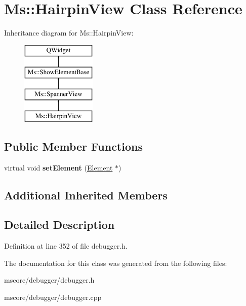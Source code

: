\hypertarget{class_ms_1_1_hairpin_view}{}\section{Ms\+:\+:Hairpin\+View Class Reference}
\label{class_ms_1_1_hairpin_view}
Inheritance diagram for Ms\+:\+:Hairpin\+View\+:\begin{figure}[H]
\begin{center}
\leavevmode
\includegraphics[height=4.000000cm]{class_ms_1_1_hairpin_view}
\end{center}
\end{figure}
\subsection*{Public Member Functions}
\begin{DoxyCompactItemize}
\item 
\mbox{\label{class_ms_1_1_hairpin_view_a366fc3417044393769df2a66c377f084}} 
virtual void {\bfseries set\+Element} (\hyperlink{class_ms_1_1_element}{Element} $\ast$)
\end{DoxyCompactItemize}
\subsection*{Additional Inherited Members}


\subsection{Detailed Description}


Definition at line 352 of file debugger.\+h.



The documentation for this class was generated from the following files\+:\begin{DoxyCompactItemize}
\item 
mscore/debugger/debugger.\+h\item 
mscore/debugger/debugger.\+cpp\end{DoxyCompactItemize}

